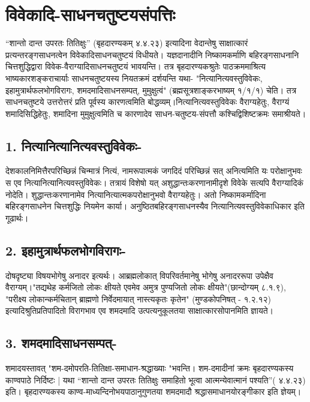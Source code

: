 \section*{विवेकादि-साधनचतुष्टयसंपत्तिः}

“शान्तो दान्त उपरतः तितिक्षुः” (बृहदारण्यकम् ४.४.२३) इत्यादिना वेदान्तेषु साक्षात्कारं प्रत्यन्तरङ्गसाधनत्वेन विवेकादिसाधनचतुष्टयं विधीयते। यज्ञदानादीनि निष्कामकर्माणि बहिरङ्गसाधनानि चित्तशुद्धिद्वारा विवेक-वैराग्यादिसाधनचतुष्टयं भावयन्ति। तत्र बृहदारण्यकश्रुतेः पाठक्रममाश्रित्य भाष्यकारशङ्कराचार्याः साधनचतुष्टयस्य नियतक्रमं दर्शयन्ति यथा- "नित्यानित्यवस्तुविवेकः, इहामुत्रार्थफलभोगविरागः, शमदमादिसाधनसम्पत्, मुमुक्षुत्वं" (ब्रह्मसूत्रशाङ्करभाष्यम् १/१/१) चेति। तत्र साधनचतुष्टये उत्तरोत्तरं प्रति पूर्वस्य कारणत्वमिति बोद्धव्यम्।नित्यानित्यवस्तुविवेकः वैराग्यहेतुः, वैराग्यं शमादिसिद्धिहेतुः, शमादिना मुमुक्षुत्वमिति च कारणादेव साधन-चतुष्टय-संपत्तौ कश्चिद्विशिष्टक्रमः समाश्रीयते।

\subsection*{1. नित्यानित्यानित्यवस्तुविवेकः-}

देशकालनिमित्तैरपरिच्छिन्नं चिन्मात्रं नित्यं, नामरूपात्मकं जगदिदं परिच्छिन्नं सत् अनित्यमिति यः परोक्षानुभवः स एव नित्यानित्यानित्यवस्तुविवेकः। तत्रायं विशेषो यत् अशुद्धान्तःकरणानामीदृशे विवेके सत्यपि वैराग्यादिकं नोदेति। शुद्धान्तःकरणानामेव नित्यानित्यात्मकपरोक्षानुभवो वैराग्यहेतुः। अतो निष्कामकर्मादिना बहिरङ्गसाधनेन चित्तशुद्धिः नियमेन कार्या। अनुष्ठितबहिरङ्गसाधनस्यैव नित्यानित्यवस्तुविवेकाधिकार इति गूढार्थः।

\subsection*{2. इहामुत्रार्थफलभोगविरागः-}

दोषदृष्ट्या विषयभोगेषु अनादर इत्यर्थः। आब्रह्मलोकात् विपरिवर्तमानेषु भोगेषु अनादररूपा उपेक्षैव वैराग्यम्।"तद्यथेह कर्मजितो लोकः क्षीयते एवमेव अमुत्र पुण्यजितो लोकः क्षीयते"(छान्दोग्यम् ८.१.९), "परीक्ष्य लोकान्कर्मचितान् ब्राह्मणो निर्वेदमायात् नास्त्यकृतः कृतेन" (मुण्डकोपनिषत् - १.२.१२) इत्यादिश्रुतिप्रतिपादितो विरागभाव एव शमदमादि उत्पत्यनुकूलतया साक्षात्कारसोपानमिति ज्ञायते।

\subsection*{3. शमदमादिसाधनसम्पत्-}

शमादयस्तावत् "शम-दमोपरति-तितिक्षा-समाधान-श्रद्धाख्याः "भवन्ति। शम-दमादीनां क्रमः बृहदारण्यकस्य काण्वपाठे निर्दिष्टः | यथा “शान्तो दान्त उपरतः तितिक्षुः समाहितो भूत्वा आत्मन्येवात्मानं पश्यति”( ४.४.२३) इति। बृहदारण्यकस्य काण्व-माध्यन्दिनोभयपाठानुगुणतया शमदमादौ श्रद्धासमाधानयोरङ्गीकार इति ज्ञेयम्।


